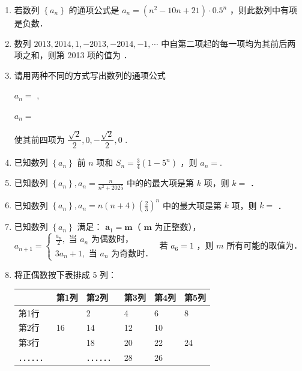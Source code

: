 \begin{enumerate}
    \item 若数列 $\left\{a_n\right\}$ 的通项公式是 $a_n=\left(n^2-10 n+21\right) \cdot 0.5^n$ ，则此数列中有项是负数．

\item 数列 $2013,2014,1,-2013,-2014,-1, \cdots$ 中自第二项起的每一项均为其前后两项之和，则第 2013 项的值为 ．

\item 请用两种不同的方式写出数列的通项公式

    ${a}_{n} =$ ,
    
    ${a}_{n} =$ 
    
    使其前四项为 $\dfrac{\sqrt{2}}{2},0, - \dfrac{\sqrt{2}}{2},0$ .

\item 已知数列 $\left\{a_n\right\}$ 前 $n$ 项和 $S_n=\frac{3}{4}\left(1-5^n\right)$ ，则 $a_n=$.

\item 已知数列 $\left\{a_n\right\}, a_n=\frac{n}{n^2+2025}$ 中的的最大项是第 $k$ 项，则 $k=$ ．

\item 已知数列 $\left\{a_n\right\}, a_n=n(n+4)\left(\frac{2}{3}\right)^n$ 中的最大项是第 $k$ 项，则 $k=$  ．

\item 已知数列 $\left\{a_n\right\}$ 满足： $\boldsymbol{a}_1=\boldsymbol{m}$（ $\boldsymbol{m}$ 为正整数），$a_{n+1}=\left\{\begin{array}{l}\frac{a_n}{2}, \text { 当 } a_n \text { 为偶数时，} \\ 3 a_n+1, \text { 当 } a_n \text { 为奇数时．}\end{array}\right.$ 若 $a_6=1$ ，则 $m$ 所有可能的取值为．

\item 将正偶数按下表排成 5 列：
\begin{tabular}{|l|l|l|l|l|l|}
\hline & 第1列 & 第2列 & 第3列 & 第4列 & 第5列 \\
\hline 第1行 & & 2 & 4 & 6 & 8 \\
\hline 第2行 & 16 & 14 & 12 & 10 & \\
\hline 第3行 & & 18 & 20 & 22 & 24 \\
\hline ．．．．．． & & ．．．．．． & 28 & 26 & \\
\hline
\end{tabular}


\end{enumerate}

